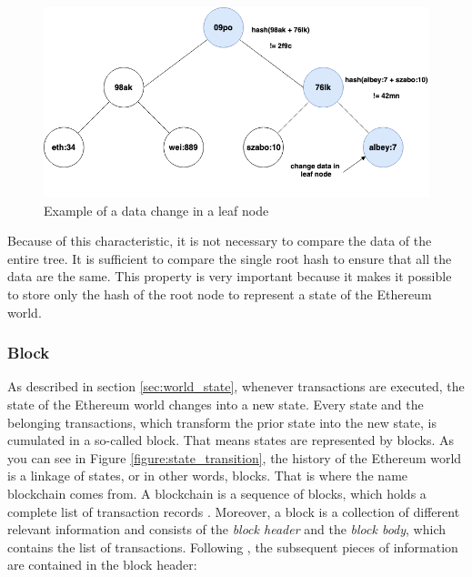 \begin{figure}[htbp]
	\centering
	\includegraphics[width=.75\linewidth]{./figures/merkle_tree_change.png}
	\caption{Example of a data change in a leaf node}
	\label{figure:merkle_tree_change}
\end{figure}

Because of this characteristic, it is not necessary to compare the data of the entire tree. 
It is sufficient to compare the single root hash to ensure that all the data are the same. 
This property is very important because it makes it possible to store only the hash of 
the root node to represent a state of the Ethereum world. 

\subsubsection{Block} 
\label{sec:block}
As described in section \ref{sec:world_state}, whenever transactions are executed, 
the state of the Ethereum world changes into a new state. 
Every state and the belonging transactions, which transform the prior state into 
the new state, is cumulated in a so-called block. That means states are represented 
by blocks. As you can see in Figure \ref{figure:state_transition}, the history of 
the Ethereum world is a linkage of states, or in other words, blocks. 
That is where the name blockchain comes from. A blockchain is a sequence 
of blocks, which holds a complete list of transaction records . 
Moreover, a block is a collection of different relevant information and 
consists of the \textit{block header} and the \textit{block body}, 
which contains the list of transactions. Following , 
the subsequent pieces of information are contained in the block header:

